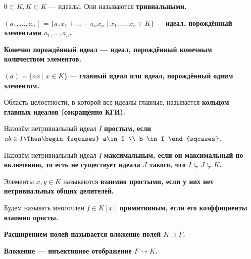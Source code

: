 \begin{defn}
\(0 \subset K, K \subset K\) --- идеалы. Они называются \bf{тривиальными}.
\end{defn}

\begin{defn}
\((a_1,\ldots,a_n) = \{a_1x_1+\ldots+a_nx_n \mid x_1,\ldots,x_n \in K\}\) --- \bf{идеал, порождённый элементами \(a_1,\ldots,a_n\)}.
\end{defn}

\begin{defn}
\bf{Конечно порождённый идеал} --- идеал, порождённый конечным количеством элементов.
\end{defn}

\begin{defn}
\((a) = \{ax \mid x\in K\}\) --- \bf{главный идеал} или \bf{идеал, порождённый одним элементом}.
\end{defn}

\begin{defn}
Область целостности, в которой все идеалы главные, называется \bf{кольцом главных идеалов} (сокращённо КГИ).
\end{defn}

\begin{defn}
Назовём нетривиальный идеал \(I\) \bf{простым}, если \(ab \in I \Then \begin{sqcases} a\in I \\ b \in I \end{sqcases}\).
\end{defn}

\begin{defn}
Назовём нетривиальный идеал \(I\) \bf{максимальным}, если он максимальный по включению, то есть не существует идеала \(J\) такого, что \(I \subsetneq J \subsetneq K\).
\end{defn}

\begin{defn}
Элементы $x, y \in K$ называются \bf{взаимно простыми}, если у них нет нетривиальных общих делителей.

Будем называть многочлен \(f \in K[x]\) \bf{примитивным}, если его коэффициенты взаимно просты.
\end{defn}

\begin{defn}
\bf{Расширением полей} называется вложение полей \(K \supset F\).

\bf{Вложение} --- инъективное отображение \(F \to K\).
\end{defn}

